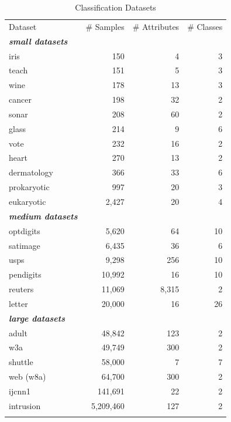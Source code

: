\documentclass{article}
\begin{document}
\begin{table}[t!]
\caption*{Classification Datasets}\vspace{-1em}
\footnotesize \centering
\begin{tabularx}{0.5\textwidth}{l@{\extracolsep{\fill}}rrr}
\hline\noalign{\smallskip}
Dataset & \# Samples & \# Attributes & \# Classes \\
\noalign{\smallskip}\hline\noalign{\smallskip}
\textbf{\textit{small datasets}} & \\
iris & 150 & 4 &  3  \\ 
teach & 151 & 5 &  3  \\ 
wine & 178 & 13 &  3  \\ 
cancer & 198 & 32 &  2  \\ 
sonar & 208 & 60 &  2  \\ 
glass & 214 & 9 &  6  \\ 
vote & 232 & 16 &  2  \\ 
heart & 270 & 13 &  2  \\ 
dermatology & 366 & 33 &  6  \\ 
prokaryotic & 997 & 20 &  3  \\ 
eukaryotic & 2,427 & 20 &  4  \\ 
\textbf{\textit{medium datasets}} & \\
optdigits & 5,620 & 64 &  10  \\ 
satimage & 6,435 & 36 &  6  \\ 
usps & 9,298 & 256 &  10  \\ 
pendigits & 10,992 & 16 &  10  \\ 
reuters & 11,069 & 8,315 &  2  \\ 
letter & 20,000 & 16 &  26  \\ 
\textbf{\textit{large datasets}} & \\
adult & 48,842 & 123 &  2  \\ 
w3a & 49,749 & 300 &  2  \\ 
shuttle & 58,000 & 7 &  7  \\ 
web (w8a) & 64,700 & 300 &  2  \\ 
ijcnn1 & 141,691 & 22 &  2  \\ 
intrusion & 5,209,460 & 127 &  2  \\  
\noalign{\smallskip}\hline
\end{tabularx}
\end{table}

\newpage
\end{document}
